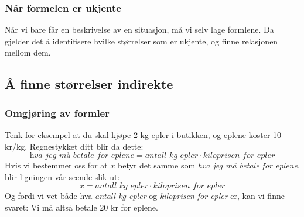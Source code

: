 \subsubsection{Når formelen er ukjente}
Når vi bare får en beskrivelse av en situasjon, må vi selv lage formlene. Da gjelder det å identifisere hvilke størrelser som er ukjente, og finne relasjonen mellom dem.\regv
{}

\subsection{Å finne størrelser indirekte}
\subsubsection{Omgjøring av formler}
\newpage
Tenk for eksempel at du skal kjøpe 2 kg epler i butikken, og eplene koster 10 kr/kg. Regnestykket ditt blir da dette:
\small
\[ \textit{hva jeg må betale for eplene}=\textit{antall kg epler}\cdot \textit{kiloprisen for epler} \]
\normalsize
Hvis vi bestemmer oss for at $ x $ betyr det samme som \textit{hva jeg må betale for eplene}, blir ligningen vår seende slik ut:
\[ x=\textit{antall kg epler}\cdot \textit{kiloprisen for epler} \]
Og fordi vi vet både hva \textit{antall kg epler} og \textit{kiloprisen for epler} er, kan vi finne svaret:\vs
{}
Vi må altså betale 20 kr for eplene. \vsk 

